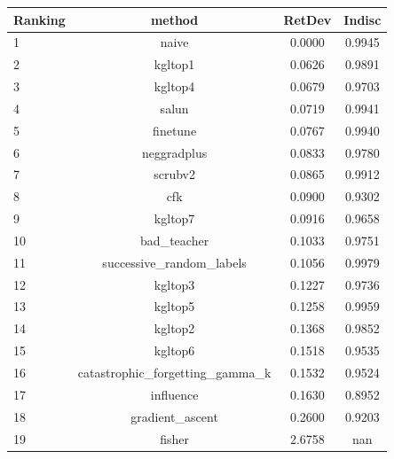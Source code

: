 \begin{tabular}{lccc}
\toprule
Ranking & method & RetDev & Indisc \\
\midrule
1 & naive & 0.0000 & 0.9945 \\
2 & kgltop1 & 0.0626 & 0.9891 \\
3 & kgltop4 & 0.0679 & 0.9703 \\
4 & salun & 0.0719 & 0.9941 \\
5 & finetune & 0.0767 & 0.9940 \\
6 & neggradplus & 0.0833 & 0.9780 \\
7 & scrubv2 & 0.0865 & 0.9912 \\
8 & cfk & 0.0900 & 0.9302 \\
9 & kgltop7 & 0.0916 & 0.9658 \\
10 & bad_teacher & 0.1033 & 0.9751 \\
11 & successive_random_labels & 0.1056 & 0.9979 \\
12 & kgltop3 & 0.1227 & 0.9736 \\
13 & kgltop5 & 0.1258 & 0.9959 \\
14 & kgltop2 & 0.1368 & 0.9852 \\
15 & kgltop6 & 0.1518 & 0.9535 \\
16 & catastrophic_forgetting_gamma_k & 0.1532 & 0.9524 \\
17 & influence & 0.1630 & 0.8952 \\
18 & gradient_ascent & 0.2600 & 0.9203 \\
19 & fisher & 2.6758 & nan \\
\bottomrule
\end{tabular}
